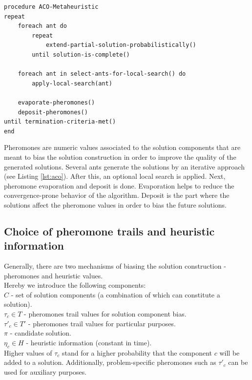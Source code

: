 \documentclass[11pt,a4paper,oneside]{book}
\begin{document}
\begin{minipage}[c]{0.95\textwidth}
\begin{lstlisting}[caption={General ACO pseudo-code}, label={lst:aco}]
procedure ACO-Metaheuristic
repeat
	foreach ant do
		repeat
			extend-partial-solution-probabilistically()
		until solution-is-complete()
	
	foreach ant in select-ants-for-local-search() do
		apply-local-search(ant)
	
	evaporate-pheromones()
	deposit-pheromones()
until termination-criteria-met()
end
\end{lstlisting}
\end{minipage}

Pheromones are numeric values associated to the solution components that are meant to bias the solution construction in order to improve the quality of the generated solutions. Several ants generate the solutions by an iterative approach (see Listing \ref{lst:aco}). After this, an optional local search is applied. Next, pheromone evaporation and deposit is done. Evaporation helps to reduce the convergence-prone behavior of the algorithm. Deposit is the part where the solutions affect the pheromone values in order to bias the future solutions.

\subsection{Choice of pheromone trails and heuristic information}

Generally, there are two mechanisms of biasing the solution construction - pheromones and heuristic values. \\
Hereby we introduce the following components: \\
$C$ - set of solution components (a combination of which can constitute a solution). \\
$\tau_c \in T$ - pheromones trail values for solution component bias. \\
$\tau'_c \in T'$ - pheromones trail values for particular purposes. \\
$\pi$ - candidate solution. \\
$\eta_c \in H$ - heuristic information (constant in time). \\

Higher values of $\tau_c$ stand for a higher probability that the component $c$ will be added to a solution. Additionally, problem-specific pheromones such as $\tau'_c$ can be used for auxiliary purposes. 
\end{document}
